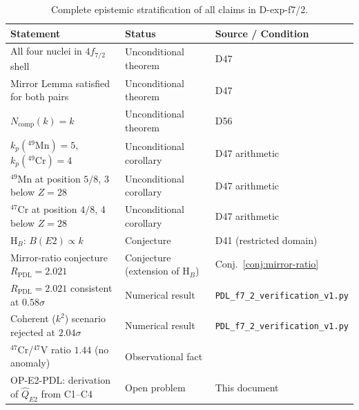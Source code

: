 \documentclass[12pt,a4paper]{article}
\theoremstyle{remark}
\begin{document}
\begin{table}[h]
\centering
\caption{Complete epistemic stratification of all claims in D-exp-f7/2.}
\label{tab:epistemic}
\renewcommand{\arraystretch}{1.25}
\begin{tabular}{p{5.2cm} p{2.5cm} p{4.5cm}}
\toprule
\textbf{Statement} & \textbf{Status} & \textbf{Source / Condition} \\
\midrule
All four nuclei in $4f_{7/2}$ shell & Unconditional theorem & D47 \\
Mirror Lemma satisfied for both pairs & Unconditional theorem & D47 \\
$N_{\text{comp}}(k) = k$ & Unconditional theorem & D56 \\
$k_p(^{49}\text{Mn}) = 5$, $k_p(^{49}\text{Cr}) = 4$ & Unconditional corollary & D47 arithmetic \\
$^{49}$Mn at position $5/8$, 3 below $Z=28$ & Unconditional corollary & D47 arithmetic \\
$^{47}$Cr at position $4/8$, 4 below $Z=28$ & Unconditional corollary & D47 arithmetic \\
H$_B$: $B(E2) \propto k$ & Conjecture & D41 (restricted domain) \\
Mirror-ratio conjecture $R_\text{PDL} = 2.021$ & Conjecture (extension of H$_B$) & Conj.~\ref{conj:mirror-ratio} \\
$R_\text{PDL} = 2.021$ consistent at $0.58\sigma$ & Numerical result & \texttt{PDL\_f7\_2\_verification\_v1.py} \\
Coherent ($k^2$) scenario rejected at $2.04\sigma$ & Numerical result & \texttt{PDL\_f7\_2\_verification\_v1.py} \\
$^{47}$Cr/$^{47}$V ratio $1.44$ (no anomaly) & Observational fact & \cite{Escudeiro_2026} \\
OP-E2-PDL: derivation of $\hat{Q}_{E2}$ from C1--C4 & Open problem & This document \\
\bottomrule
\end{tabular}
\end{table}

\clearpage



\end{document}
